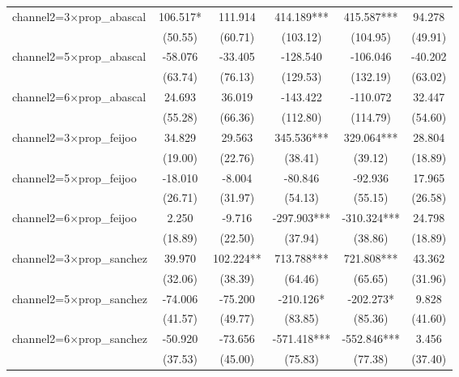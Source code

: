 \begin{tabular}{l*{5}{c}}
channel2=3$\times$prop\_abascal&     106.517*  &     111.914   &     414.189***&     415.587***&      94.278   \\
                    &     (50.55)   &     (60.71)   &    (103.12)   &    (104.95)   &     (49.91)   \\
channel2=5$\times$prop\_abascal&     -58.076   &     -33.405   &    -128.540   &    -106.046   &     -40.202   \\
                    &     (63.74)   &     (76.13)   &    (129.53)   &    (132.19)   &     (63.02)   \\
channel2=6$\times$prop\_abascal&      24.693   &      36.019   &    -143.422   &    -110.072   &      32.447   \\
                    &     (55.28)   &     (66.36)   &    (112.80)   &    (114.79)   &     (54.60)   \\
channel2=3$\times$prop\_feijoo&      34.829   &      29.563   &     345.536***&     329.064***&      28.804   \\
                    &     (19.00)   &     (22.76)   &     (38.41)   &     (39.12)   &     (18.89)   \\
channel2=5$\times$prop\_feijoo&     -18.010   &      -8.004   &     -80.846   &     -92.936   &      17.965   \\
                    &     (26.71)   &     (31.97)   &     (54.13)   &     (55.15)   &     (26.58)   \\
channel2=6$\times$prop\_feijoo&       2.250   &      -9.716   &    -297.903***&    -310.324***&      24.798   \\
                    &     (18.89)   &     (22.50)   &     (37.94)   &     (38.86)   &     (18.89)   \\
channel2=3$\times$prop\_sanchez&      39.970   &     102.224** &     713.788***&     721.808***&      43.362   \\
                    &     (32.06)   &     (38.39)   &     (64.46)   &     (65.65)   &     (31.96)   \\
channel2=5$\times$prop\_sanchez&     -74.006   &     -75.200   &    -210.126*  &    -202.273*  &       9.828   \\
                    &     (41.57)   &     (49.77)   &     (83.85)   &     (85.36)   &     (41.60)   \\
channel2=6$\times$prop\_sanchez&     -50.920   &     -73.656   &    -571.418***&    -552.846***&       3.456   \\
                    &     (37.53)   &     (45.00)   &     (75.83)   &     (77.38)   &     (37.40)   \\

\end{tabular}
